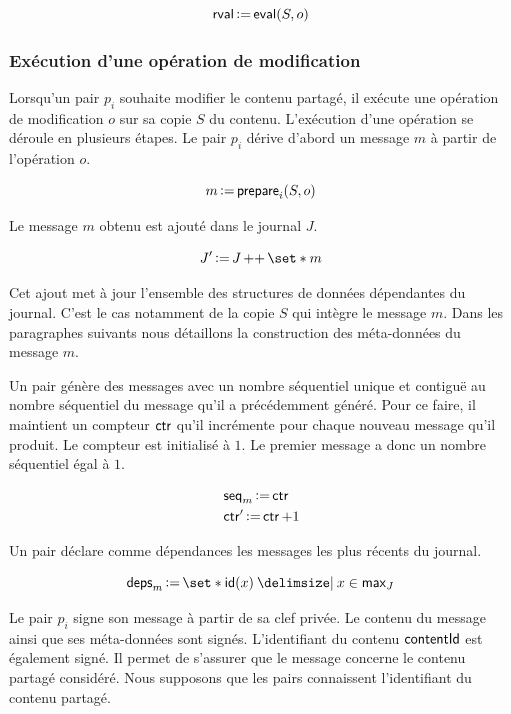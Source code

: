 \begin{equation*}
    \operatorname{\mathsf{rval}} \operatorname{\vcentcolon=} \operatorname{\mathsf{eval}}(S, o)
\end{equation*}


\subsubsection{Exécution d'une opération de modification}

Lorsqu'un pair $p_i$ souhaite modifier le contenu partagé, il exécute une opération de modification $o$ sur sa copie $S$ du contenu.
L'exécution d'une opération se déroule en plusieurs étapes.
Le pair $p_i$ dérive d'abord un message $m$ à partir de l'opération $o$.

\begin{equation*}
    m \operatorname{\vcentcolon=} \operatorname{\mathsf{prepare}}_i(S, o)
\end{equation*}

Le message $m$ obtenu est ajouté dans le journal $J$.

\begin{equation*}
    J' \assign J \lappend \set*{m}
\end{equation*}

Cet ajout met à jour l'ensemble des structures de données dépendantes du journal.
C'est le cas notamment de la copie $S$ qui intègre le message $m$.
Dans les paragraphes suivants nous détaillons la construction des méta-données du message $m$.

Un pair génère des messages avec un nombre séquentiel unique et contiguë au nombre séquentiel du message qu'il a précédemment généré.
Pour ce faire, il maintient un compteur $\operatorname{\mathsf{ctr}}$ qu'il incrémente pour chaque nouveau message qu'il produit.
Le compteur est initialisé à $1$.
Le premier message a donc un nombre séquentiel égal à $1$.

\begin{align*}
    &\operatorname{\mathsf{seq}}_m \operatorname{\vcentcolon=} \operatorname{\mathsf{ctr}}\\
    &\operatorname{\mathsf{ctr}}' \operatorname{\vcentcolon=} \operatorname{\mathsf{ctr}} + 1
\end{align*}

Un pair déclare comme dépendances les messages les plus récents du journal.

\begin{equation*}
    \trm{deps}_m \assign \set*{\trm{id}(x) \given x \in \trm{max}_J}
\end{equation*}

Le pair $p_i$ signe son message à partir de sa clef privée.
Le contenu du message ainsi que ses méta-données sont signés.
L'identifiant du contenu $\operatorname{\mathsf{contentId}}$ est également signé.
Il permet de s'assurer que le message concerne le contenu partagé considéré.
Nous supposons que les pairs connaissent l'identifiant du contenu partagé.

